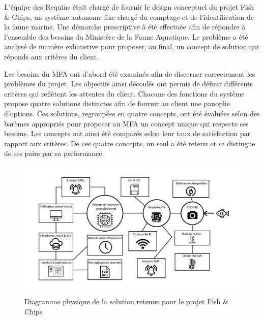 L'équipe des Requins était chargé de fournir le design conceptuel du projet Fish \& Chips, un système autonome fixe chargé du comptage et de l'identification de la faune marine. Une démarche prescriptive à été effectuée afin de répondre à l'ensemble des besoins du Ministère de la Faune Aquatique. Le problème a été analysé de manière exhaustive pour proposer, au final, un concept de solution qui réponds aux critères du client.
\vspace{5mm}

Les besoins du MFA ont d'abord été examinés afin de discerner correctement les problèmes du projet. Les objectifs ainsi découlés ont permis de définir différents critères qui reflètent les attentes du client. Chacune des fonctions du système propose quatre solutions distinctes afin de fournir au client une panoplie d'options. Ces solutions, regroupées en quatre concepts, ont été évaluées selon des barèmes appropriés pour proposer au MFA un concept unique qui respecte ses besoins. Les concepts ont ainsi été comparés selon leur taux de satisfaction par rapport aux critères. De ces quatre concepts, un seul a été retenu et se distingue de ses pairs par sa performance.

 
 
 
    
\begin{figure}
        \centering
        \includegraphics[width=\linewidth]{fig/schema_designnnnnn.jpg}
        \caption{Diagramme physique de la solution retenue pour le projet Fish \& Chips}
        \label{fig:concept_retenu}
\end{figure}

